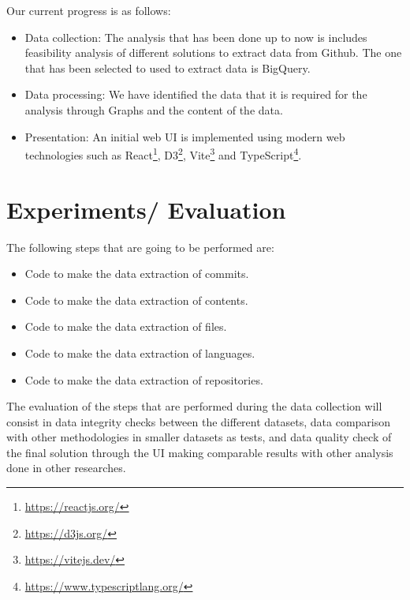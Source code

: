 \documentclass[sigconf,11pt]{acmart}
\begin{document}
Our current progress is as follows:

\begin{itemize}
    \item Data collection: The analysis that has been done up to now is includes
      feasibility analysis of different solutions to extract data from Github.
      The one that has been selected to used to extract data is BigQuery.
    \item Data processing: We have identified the data that it is required for the analysis through Graphs and the content of the data.
    \item Presentation: An initial web UI is implemented using modern web technologies
      such as React\footnote{\url{https://reactjs.org/}}, D3\footnote{\url{https://d3js.org/}},
      Vite\footnote{\url{https://vitejs.dev/}} and TypeScript\footnote{\url{https://www.typescriptlang.org/}}.
\end{itemize}

\section*{Experiments/ Evaluation}

The following steps that are going to be performed are:
\begin{itemize}
  \item Code to make the data extraction of commits.
  \item Code to make the data extraction of contents.
  \item Code to make the data extraction of files.
  \item Code to make the data extraction of languages.
  \item Code to make the data extraction of repositories.
\end{itemize}

The evaluation of the steps that are performed during the data collection will consist in data integrity checks between the different datasets, data comparison with other methodologies in smaller datasets as tests, and data quality check of the final solution through the UI making comparable results with other analysis done in other researches.
\end{document}
